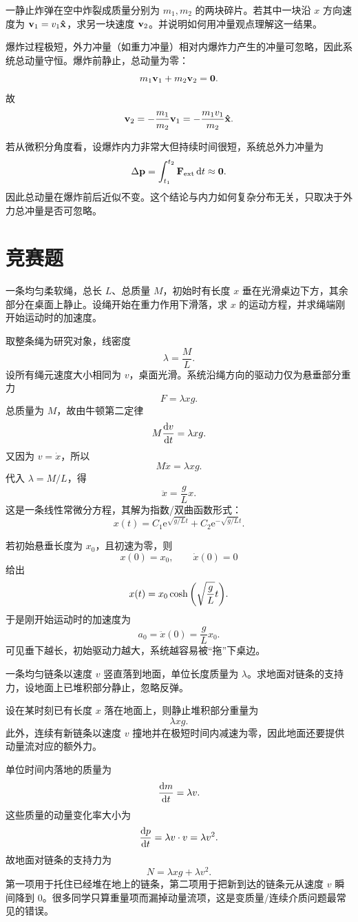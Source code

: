 \begin{classic}
一静止炸弹在空中炸裂成质量分别为 $m_1,m_2$ 的两块碎片。若其中一块沿 $x$ 方向速度为 $\vb v_1=v_1\vu x$，求另一块速度 $\vb v_2$。并说明如何用冲量观点理解这一结果。

\begin{solution}
爆炸过程极短，外力冲量（如重力冲量）相对内爆炸力产生的冲量可忽略，因此系统总动量守恒。爆炸前静止，总动量为零：
\[
m_1\vb v_1+m_2\vb v_2=\vb 0.
\]
故
\[
\vb v_2=-\frac{m_1}{m_2}\vb v_1=-\frac{m_1v_1}{m_2}\vu x.
\]

若从微积分角度看，设爆炸内力非常大但持续时间很短，系统总外力冲量为
\[
\Delta \vb p=\int_{t_1}^{t_2}\vb F_\text{ext}\,\dd t\approx \vb 0.
\]
因此总动量在爆炸前后近似不变。这个结论与内力如何复杂分布无关，只取决于外力总冲量是否可忽略。
\end{solution}
\end{classic}

\section*{竞赛题}

\begin{competition}
一条均匀柔软绳，总长 $L$、总质量 $M$，初始时有长度 $x$ 垂在光滑桌边下方，其余部分在桌面上静止。设绳开始在重力作用下滑落，求 $x$ 的运动方程，并求绳端刚开始运动时的加速度。

\begin{solution}
取整条绳为研究对象，线密度
\[
\lambda=\frac{M}{L}.
\]
设所有绳元速度大小相同为 $v$，桌面光滑。系统沿绳方向的驱动力仅为悬垂部分重力
\[
F=\lambda x g.
\]
总质量为 $M$，故由牛顿第二定律
\[
M\dv{v}{t}=\lambda x g.
\]
又因为 $v=\dot x$，所以
\[
M\ddot x=\lambda x g.
\]
代入 $\lambda=M/L$，得
\[
\ddot x=\frac{g}{L}x.
\]
这是一条线性常微分方程，其解为指数/双曲函数形式：
\[
x(t)=C_1\mathrm e^{\sqrt{g/L}t}+C_2\mathrm e^{-\sqrt{g/L}t}.
\]

若初始悬垂长度为 $x_0$，且初速为零，则
\[
x(0)=x_0,
\qquad \dot x(0)=0
\]
给出
\[
x(t)=x_0\cosh\qty(\sqrt{\frac{g}{L}}t).
\]
于是刚开始运动时的加速度为
\[
a_0=\ddot x(0)=\frac{g}{L}x_0.
\]
可见垂下越长，初始驱动力越大，系统越容易被“拖”下桌边。
\end{solution}
\end{competition}

\begin{competition}
一条均匀链条以速度 $v$ 竖直落到地面，单位长度质量为 $\lambda$。求地面对链条的支持力，设地面上已堆积部分静止，忽略反弹。

\begin{solution}
设在某时刻已有长度 $x$ 落在地面上，则静止堆积部分重量为
\[
\lambda x g.
\]
此外，连续有新链条以速度 $v$ 撞地并在极短时间内减速为零，因此地面还要提供动量流对应的额外力。

单位时间内落地的质量为
\[
\dv{m}{t}=\lambda v.
\]
这些质量的动量变化率大小为
\[
\dv{p}{t}=\lambda v\cdot v=\lambda v^2.
\]
故地面对链条的支持力为
\[
N=\lambda x g+\lambda v^2.
\]
第一项用于托住已经堆在地上的链条，第二项用于把新到达的链条元从速度 $v$ 瞬间降到 $0$。很多同学只算重量项而漏掉动量流项，这是变质量/连续介质问题最常见的错误。
\end{solution}
\end{competition}

